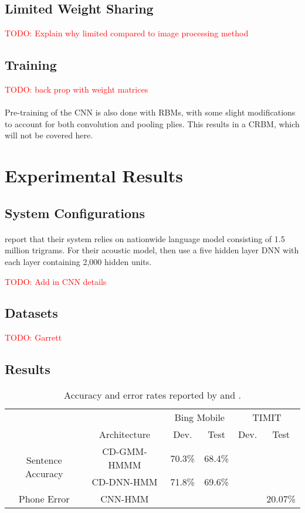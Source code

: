 \documentclass[letterpaper]{article}
\newcommand{\TODO}[1]{\textcolor{red}{TODO: #1}}
\begin{document}
\subsection*{Limited Weight Sharing}
\TODO{Explain why limited compared to image processing method}

\subsection*{Training}
\TODO{back prop with weight matrices}

\paragraph{}Pre-training of the CNN is also done with RBMs, with some slight modifications to account for both convolution and pooling plies. This results in a CRBM, which will not be covered here. 

\section*{Experimental Results} 

\subsection*{System Configurations}

\paragraph{} \cite{DBLP:journals/taslp/DahlYDA12} report that their system relies on nationwide language model consisting of 1.5 million trigrams. For their acoustic model, then use a five hidden layer DNN with each layer containing 2,000 hidden units. 

\TODO{Add in CNN details}

\subsection*{Datasets}

\TODO{Garrett}

\subsection*{Results}

\begin{table}[H]
	\centering
	\begin{tabular}{c|c|c|c|c|c}
		& & \multicolumn{2}{c|}{Bing Mobile} & \multicolumn{2}{c}{TIMIT}\\
		& Architecture & Dev. & Test  & Dev. & Test \\
		\hline
		\multirow{2}{*}{Sentence Accuracy} & CD-GMM-HMMM & 70.3\% & 68.4\% & & \\
		& CD-DNN-HMM & 71.8\% & 69.6\% & & \\
		\hline
		Phone Error & CNN-HMM  & & &  & 20.07\%
	\end{tabular}
	\caption{Accuracy and error rates reported by \cite{DBLP:journals/taslp/DahlYDA12} and \cite{DBLP:journals/taslp/Abdel-HamidMJDPY14}.}
	\label{tbl:results}
\end{table}
\end{document}
